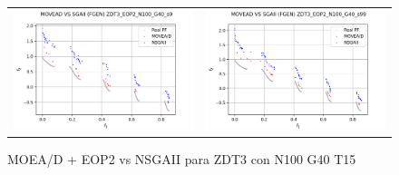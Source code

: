 \begin{figure}[H]
\begin{tabular}{c c}
    \includegraphics[scale=0.5]{figures/ZDT3_EOP2_N100_G40_T15/s9_comp.png} &
    \includegraphics[scale=0.5]{figures/ZDT3_EOP2_N100_G40_T15/s99_comp.png}\\
    \end{tabular}
    \caption{\centering MOEA/D + EOP2 vs NSGAII para ZDT3 con N100 G40 T15}
    \label{fig:11}
\end{figure}


